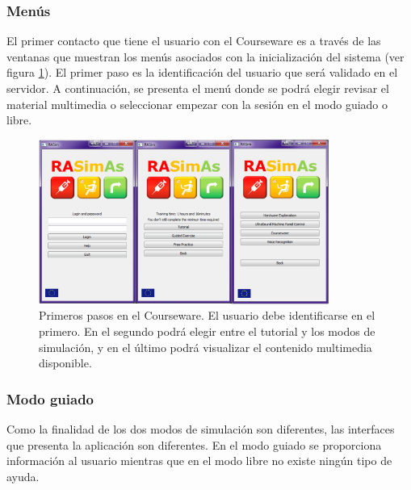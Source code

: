 \subsubsection{Menús} 

El primer contacto que tiene el usuario con el \ac{Courseware} es a través de las ventanas que muestran los menús asociados con la inicialización del sistema (ver figura \ref{fig:courseintro}). El primer paso es la identificación del usuario que será validado en el servidor. A continuación, se presenta el menú donde se podrá elegir revisar el material multimedia o seleccionar empezar con la sesión en el modo guiado o libre. %

\begin{figure}[ht]
    \centering
    \includegraphics[width=0.85\textwidth]{IMG/coursewareintro.PNG}
    \caption{Primeros pasos en el \acs{Courseware}. El usuario debe identificarse en el primero. En el segundo podrá elegir entre el tutorial y los modos de simulación, y en el último podrá visualizar el contenido multimedia disponible.}
    \label{fig:courseintro}
\end{figure}

\subsubsection{Modo guiado}

Como la finalidad de los dos modos de simulación son diferentes, las interfaces que presenta la aplicación son diferentes. En el modo guiado se proporciona información al usuario mientras que en el modo libre no existe ningún tipo de ayuda.

